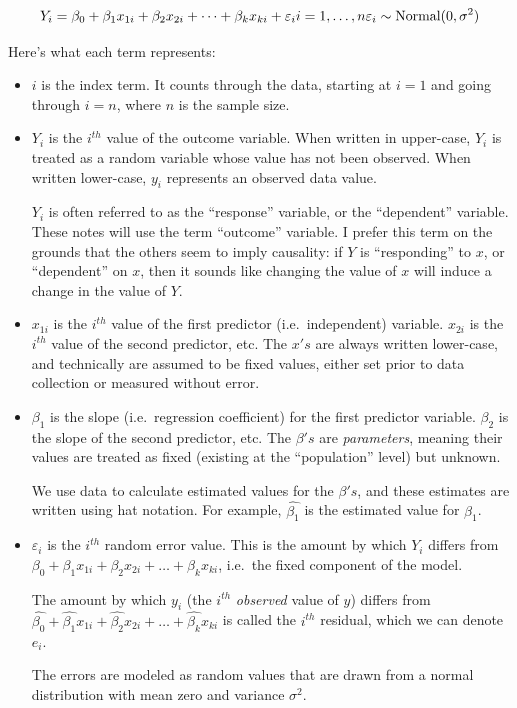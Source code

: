 \documentclass[
  letterpaper,
  DIV=11,
  numbers=noendperiod]{scrreprt}
\begin{document}
\[
Y_i=\beta_0+\beta_1x_{1i} + \beta_2x_{2i} + \dots + \beta_kx_{ki} + \varepsilon_i \\
i = 1, \dots, n \\
\varepsilon_i \sim \text{Normal}(0,\sigma^2) 
\]

Here's what each term represents:

\begin{itemize}
\item
  \(i\) is the index term. It counts through the data, starting at
  \(i = 1\) and going through \(i=n\), where \(n\) is the sample size.
\item
  \(Y_i\) is the \(i^{th}\) value of the outcome variable. When written
  in upper-case, \(Y_i\) is treated as a random variable whose value has
  not been observed. When written lower-case, \(y_i\) represents an
  observed data value.

  \(Y_i\) is often referred to as the ``response'' variable, or the
  ``dependent'' variable. These notes will use the term ``outcome''
  variable. I prefer this term on the grounds that the others seem to
  imply causality: if \(Y\) is ``responding'' to \(x\), or ``dependent''
  on \(x\), then it sounds like changing the value of \(x\) will induce
  a change in the value of \(Y\).
\item
  \(x_{1i}\) is the \(i^{th}\) value of the first predictor
  (i.e.~independent) variable. \(x_{2i}\) is the \(i^{th}\) value of the
  second predictor, etc. The \(x's\) are always written lower-case, and
  technically are assumed to be fixed values, either set prior to data
  collection or measured without error.
\item
  \(\beta_1\) is the slope (i.e.~regression coefficient) for the first
  predictor variable. \(\beta_2\) is the slope of the second predictor,
  etc. The \(\beta's\) are \emph{parameters}, meaning their values are
  treated as fixed (existing at the ``population'' level) but unknown.

  We use data to calculate estimated values for the \(\beta's\), and
  these estimates are written using hat notation. For example,
  \(\hat{\beta_1}\) is the estimated value for \(\beta_1\).
\item
  \(\varepsilon_i\) is the \(i^{th}\) random error value. This is the
  amount by which \(Y_i\) differs from
  \(\beta_0+\beta_1x_{1i} + \beta_2x_{2i} + \dots + \beta_kx_{ki}\),
  i.e.~the fixed component of the model.

  The amount by which \(y_i\) (the \(i^{th}\) \emph{observed} value of
  \(y\)) differs from
  \(\hat{\beta_0}+\hat{\beta_1}x_{1i} + \hat{\beta_2}x_{2i} + \dots + \hat{\beta_k}x_{ki}\)
  is called the \(i^{th}\) residual, which we can denote \(e_i\).

  The errors are modeled as random values that are drawn from a normal
  distribution with mean zero and variance \(\sigma^2\).
\end{itemize}
\end{document}

